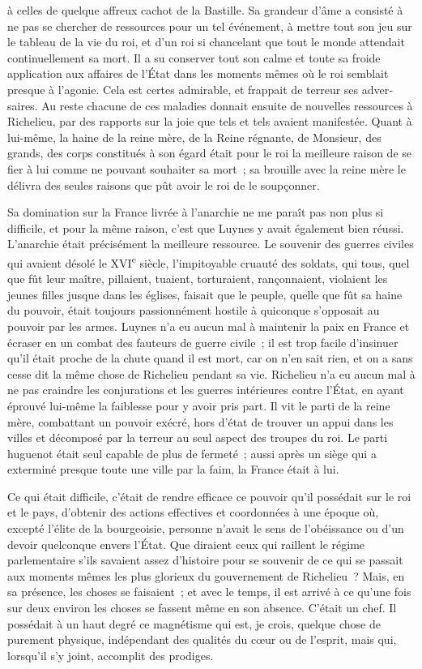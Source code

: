 \documentclass[french,twoside]{book} %
\begin{document}
à celles de quelque affreux cachot de la Bastille. Sa grandeur d'âme a consisté à ne pas se chercher de ressources pour un tel événement, à mettre tout son jeu sur le tableau de la vie du roi, et d'un roi si chancelant que tout le monde attendait continuellement sa mort. Il a su conserver tout son calme et toute sa froide application aux affaires de l'État dans les moments mêmes où le roi semblait presque à l'agonie. Cela est certes admirable, et frappait de terreur ses adver­saires. Au reste chacune de ces maladies donnait ensuite de nouvelles ressour­ces à Richelieu, par des rapports sur la joie que tels et tels avaient manifestée. Quant à lui-même, la haine de la reine mère, de la Reine régnante, de Mon­sieur, des grands, des corps constitués à son égard était pour le roi la meilleure raison de se fier à lui comme ne pouvant souhaiter sa mort ; sa brouille avec la reine mère le délivra des seules raisons que pût avoir le roi de le soupçonner.\par
Sa domination sur la France livrée à l'anarchie ne me paraît pas non plus si difficile, et pour la même raison, c'est que Luynes y avait également bien réussi. L'anarchie était précisément la meilleure ressource. Le souvenir des guerres civiles qui avaient désolé le XVI\textsuperscript{e} siècle, l'impitoyable cruauté des soldats, qui tous, quel que fût leur maître, pillaient, tuaient, torturaient, ran­çonnaient, violaient les jeunes filles jusque dans les églises, faisait que le peuple, quelle que fût sa haine du pouvoir, était toujours passionnément hostile à quiconque s'opposait au pouvoir par les armes. Luynes n'a eu aucun mal à maintenir la paix en France et écraser en un combat des fauteurs de guerre civile ; il est trop facile d'insinuer qu'il était proche de la chute quand il est mort, car on n'en sait rien, et on a sans cesse dit la même chose de Richelieu pendant sa vie. Richelieu n'a eu aucun mal à ne pas craindre les conjurations et les guerres intérieures contre l'État, en ayant éprouvé lui-même la faiblesse pour y avoir pris part. Il vit le parti de la reine mère, combattant un pouvoir exécré, hors d'état de trouver un appui dans les villes et décomposé par la terreur au seul aspect des troupes du roi. Le parti huguenot était seul capable de plus de fermeté ; aussi après un siège qui a exterminé presque toute une ville par la faim, la France était à lui.\par
Ce qui était difficile, c'était de rendre efficace ce pouvoir qu'il possédait sur le roi et le pays, d'obtenir des actions effectives et coordonnées à une époque où, excepté l'élite de la bourgeoisie, personne n'avait le sens de l'obéis­sance ou d'un devoir quelconque envers l'État. Que diraient ceux qui raillent le régime parlementaire s'ils savaient assez d'histoire pour se souvenir de ce qui se passait aux moments mêmes les plus glorieux du gouvernement de Richelieu ? Mais, en sa présence, les choses se faisaient ; et avec le temps, il est arrivé à ce qu'une fois sur deux environ les choses se fassent même en son absence. C'était un chef. Il possédait à un haut degré ce magnétisme qui est, je crois, quelque chose de purement physique, indépendant des qualités du cœur ou de l'esprit, mais qui, lorsqu'il s'y joint, accomplit des prodiges.\par
\end{document}

